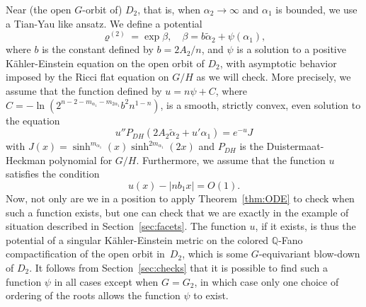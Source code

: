 \documentclass[10pt]{amsart}
\theoremstyle{plain}
\theoremstyle{definition}
\newcommand{\ta}{\tilde \alpha}
\newcommand{\rhodeux}{\varrho^{(2)}}
\begin{document}
Near (the open $G$-orbit of) $D_2$, that is, when $\alpha_2\to \infty$ and $\alpha_1$ is bounded,
we use a Tian-Yau like ansatz.
We define a potential
\[ \rhodeux=\exp \beta, \quad \beta=b\ta_2+\psi(\alpha_1), \]
where $b$ is the constant defined by $b=2A_2/n$,
and $\psi$ is a solution to a positive Kähler-Einstein equation on the open orbit of $D_2$,
with asymptotic behavior imposed by the Ricci flat equation on $G/H$ as we will check.
More precisely, we assume that the function defined by $u=n\psi+C$,
where $C=-\ln(2^{n-2-m_{\alpha_1}-m_{2\alpha_1}}b^2n^{1-n})$, is a smooth, strictly convex, even
solution to the equation
\begin{equation}
\label{eqn:eqn-psi}
u''P_{DH}(2A_2\ta_2+u'\alpha_1)=e^{-u}J
\end{equation}
with $J(x)=\sinh^{m_{\alpha_1}}(x)\sinh^{2m_{\alpha_1}}(2x)$
and $P_{DH}$ is the Duistermaat-Heckman polynomial for $G/H$.
Furthermore, we assume that the function $u$ satisfies the condition
\begin{equation}
u(x)-|nb_1x|=O(1).
\end{equation}
Now, not only are we in a position to apply Theorem~\ref{thm:ODE} to check when such a function
exists, but one can check that we are exactly in the example of situation described in
Section~\ref{sec:facets}. The function $u$, if it exists, is thus the potential of a singular
Kähler-Einstein metric on the colored $\mathbb{Q}$-Fano compactification of the open orbit in~$D_2$,
which is some $G$-equivariant blow-down of $D_2$.
It follows from Section~\ref{sec:checks} that it is possible to find such a function $\psi$ in all
cases except when $G=G_2$, in which case only one choice of ordering of the roots allows the
function $\psi$ to exist.
\end{document}
